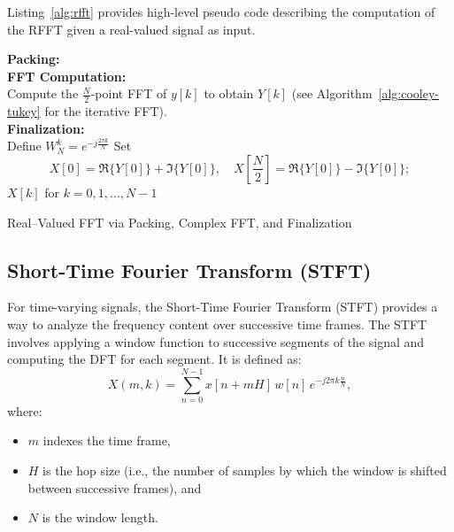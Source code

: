 \documentclass[12pt,letter]{article}
\begin{document}
Listing~\ref{alg:rfft} provides high-level pseudo code describing the
computation of the RFFT given a real-valued signal as input.

\begin{algorithm}[H]
\SetAlgoLined
{}
\textbf{Packing:}\\
\textbf{FFT Computation:}\\
Compute the $\frac{N}{2}$-point FFT of $y[k]$ to obtain $Y[k]$ \;
(see Algorithm~\ref{alg:cooley-tukey} for the iterative FFT).\\
\textbf{Finalization:}\\
Define $W_N^k = e^{-j\frac{2\pi k}{N}}$ \;
Set
\[
X[0] = \Re\{Y[0]\} + \Im\{Y[0]\}, \quad X\left[\frac{N}{2}\right] = \Re\{Y[0]\} - \Im\{Y[0]\};
\]
\Return $X[k]$ for $k = 0,1,\dots,N-1$\;
\caption{Real--Valued FFT via Packing, Complex FFT, and Finalization}
\label{alg:rfft}
\end{algorithm}

\subsection{Short-Time Fourier Transform (STFT)}

For time-varying signals, the Short-Time Fourier Transform (STFT) provides a
way to analyze the frequency content over successive time frames. The STFT
involves applying a window function to successive segments of the signal and
computing the DFT for each segment. It is defined as:
\begin{equation}
X(m, k) = \sum_{n=0}^{N-1} x[n + mH] \, w[n] \, e^{-j2\pi k \frac{n}{N}},
\label{eqn:stft}
\end{equation}
where:
\begin{itemize}
  \item $m$ indexes the time frame,
  \item $H$ is the hop size (i.e., the number of samples by which the window
  is shifted between successive frames), and
  \item $N$ is the window length.
\end{itemize}
\end{document}
